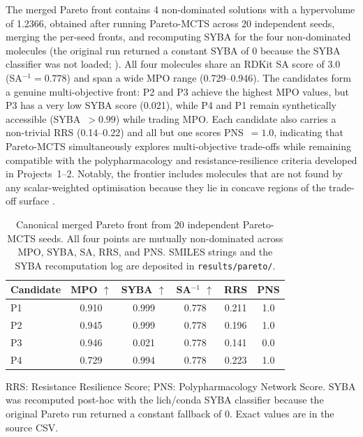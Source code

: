 \documentclass[jcim,article,layout=manuscript]{achemso}
\begin{document}
The merged Pareto front contains 4 non-dominated solutions with a
hypervolume of 1.2366, obtained after running Pareto-MCTS across 20
independent seeds, merging the per-seed fronts, and recomputing SYBA
for the four non-dominated molecules (the original run returned a
constant SYBA of 0 because the SYBA classifier was not loaded;
). All four molecules share an RDKit SA score of
3.0 (SA$^{-1}=0.778$) and span a wide MPO range (0.729--0.946). The
candidates form a genuine multi-objective front: P2 and P3 achieve the
highest MPO values, but P3 has a very low SYBA score (0.021), while P4
and P1 remain synthetically accessible (SYBA~$>0.99$) while trading MPO.
Each candidate also carries a non-trivial RRS (0.14--0.22) and all but
one scores PNS~$=1.0$, indicating that Pareto-MCTS simultaneously explores
multi-objective trade-offs while remaining compatible with the
polypharmacology and resistance-resilience criteria developed in
Projects~1--2. Notably, the frontier includes molecules that are not found
by any scalar-weighted optimisation because they lie in concave regions
of the trade-off surface \cite{Zitzler2003}.

\begin{table}[htbp]
  \centering
  \caption{Canonical merged Pareto front from 20 independent Pareto-MCTS
    seeds. All four points are mutually non-dominated across MPO, SYBA,
    SA, RRS, and PNS. SMILES strings and the SYBA recomputation log are
    deposited in \texttt{results/pareto/}.}
  \label{tab:pareto_all}
  \begin{tabular}{lccccc}
    \toprule
    Candidate & MPO $\uparrow$ & SYBA $\uparrow$ & SA$^{-1}$ $\uparrow$ & RRS & PNS \\
    \midrule
    P1 & 0.910 & 0.999 & 0.778 & 0.211 & 1.0 \\
    P2 & 0.945 & 0.999 & 0.778 & 0.196 & 1.0 \\
    P3 & 0.946 & 0.021 & 0.778 & 0.141 & 0.0 \\
    P4 & 0.729 & 0.994 & 0.778 & 0.223 & 1.0 \\
    \bottomrule
  \end{tabular}

  \vspace{2pt}
  {\footnotesize RRS: Resistance Resilience Score; PNS: Polypharmacology
    Network Score. SYBA was recomputed post-hoc with the lich/conda SYBA
    classifier because the original Pareto run returned a constant
    fallback of 0. Exact values are in the source CSV.}
\end{table}
\end{document}
